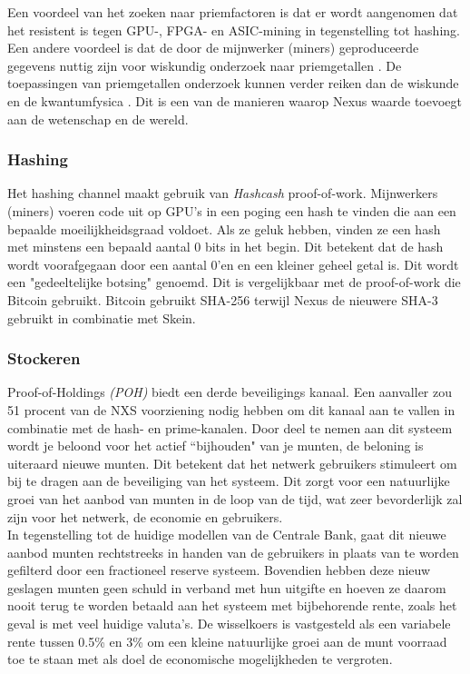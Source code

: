 \documentclass[11pt]{article}
\begin{document}
\noindent Een voordeel van het zoeken naar priemfactoren is dat er wordt aangenomen dat het resistent is tegen GPU-, FPGA- en ASIC-mining in tegenstelling tot hashing. Een andere voordeel is dat de door de mijnwerker (miners) geproduceerde gegevens nuttig zijn voor wiskundig onderzoek naar priemgetallen \cite{findingprimeclusterspaper} \cite{nxsprimecom}.
De toepassingen van priemgetallen onderzoek kunnen verder reiken dan de wiskunde en de kwantumfysica \cite{physicsmathprime}.
Dit is een van de manieren waarop Nexus waarde toevoegt aan de wetenschap en de wereld.

\subsubsection{Hashing}

Het hashing channel maakt gebruik van \textit{Hashcash} \cite{hashcash} proof-of-work.
Mijnwerkers (miners) voeren code uit \cite{skminer,wolfniro} op GPU's in een poging een hash te vinden die aan een bepaalde moeilijkheidsgraad voldoet. Als ze geluk hebben, vinden ze een hash met minstens een bepaald aantal 0 bits in het begin. Dit betekent dat de hash wordt voorafgegaan door een aantal 0’en en een kleiner geheel getal is. Dit wordt een "gedeeltelijke botsing" genoemd. Dit is vergelijkbaar met de proof-of-work die Bitcoin gebruikt. Bitcoin gebruikt SHA-256 terwijl Nexus de nieuwere SHA-3 gebruikt in combinatie met Skein.


\subsubsection{Stockeren}

Proof-of-Holdings \textit{(POH)} biedt een derde beveiligings kanaal. Een aanvaller zou 51 procent van de NXS voorziening nodig hebben om dit kanaal aan te vallen in combinatie met de hash- en prime-kanalen. Door deel te nemen aan dit systeem wordt je beloond voor het actief ``bijhouden" van je munten, de beloning is uiteraard nieuwe munten. Dit betekent dat het netwerk gebruikers stimuleert om bij te dragen aan de beveiliging van het systeem. Dit zorgt voor een natuurlijke groei van het aanbod van munten in de loop van de tijd, wat zeer bevorderlijk zal zijn voor het netwerk, de economie en gebruikers.\\ 

\noindent In tegenstelling tot de huidige modellen van de Centrale Bank, gaat dit nieuwe aanbod munten rechtstreeks in handen van de gebruikers in plaats van te worden gefilterd door een fractioneel reserve systeem. Bovendien hebben deze nieuw geslagen munten geen schuld in verband met hun uitgifte en hoeven ze daarom nooit terug te worden betaald aan het systeem met bijbehorende rente, zoals het geval is met veel huidige valuta's. De wisselkoers is vastgesteld als een variabele rente tussen 0.5\% en 3\% om een ​​kleine natuurlijke groei aan de munt voorraad toe te staan met als doel de economische mogelijkheden te vergroten.
\end{document}
